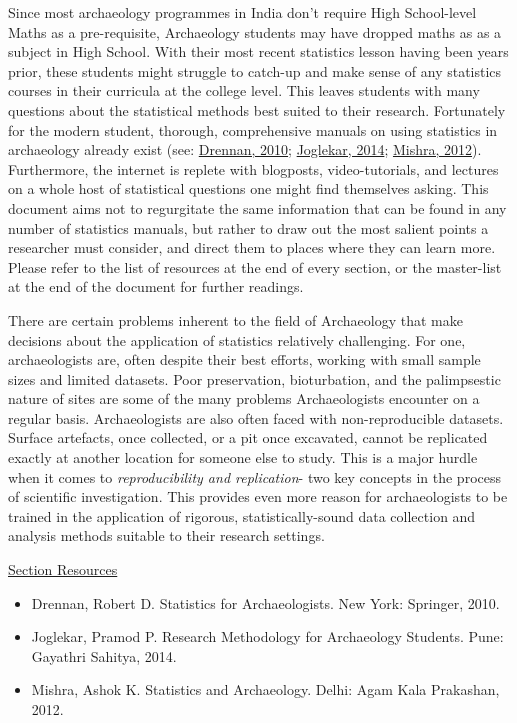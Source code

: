 \documentclass{article}
\begin{document}
Since most archaeology programmes in India don't require High School-level Maths as a pre-requisite, Archaeology students may have dropped maths as as a subject in High School. With their most recent statistics lesson having been years prior, these students might struggle to catch-up and make sense of any statistics courses in their curricula at the college level. This leaves students with many questions about the statistical methods best suited to their research. Fortunately for the modern student, thorough, comprehensive manuals on using statistics in archaeology already exist (see: \protect\hyperlink{drennan}{Drennan, 2010}; \protect\hyperlink{joglekar}{Joglekar, 2014}; \protect\hyperlink{mishra}{Mishra, 2012}). Furthermore, the internet is replete with blogposts, video-tutorials, and lectures on a whole host of statistical questions one might find themselves asking. This document aims not to regurgitate the same information that can be found in any number of statistics manuals, but rather to draw out the most salient points a researcher must consider, and direct them to places where they can learn more. Please refer to the list of resources at the end of every section, or the master-list at the end of the document for further readings.

There are certain problems inherent to the field of Archaeology that make decisions about the application of statistics relatively challenging. For one, archaeologists are, often despite their best efforts, working with small sample sizes and limited datasets. Poor preservation, bioturbation, and the palimpsestic nature of sites are some of the many problems Archaeologists encounter on a regular basis.
Archaeologists are also often faced with non-reproducible datasets. Surface artefacts, once collected, or a pit once excavated, cannot be replicated exactly at another location for someone else to study. This is a major hurdle when it comes to \textit{reproducibility and replication}- two key concepts in the process of scientific investigation. This provides even more reason for archaeologists to be trained in the application of rigorous, statistically-sound data collection and analysis methods suitable to their research settings.

\underline{Section Resources}
\begin{itemize}
    \item \hypertarget{drennan}{Drennan, Robert D. Statistics for Archaeologists. New York: Springer, 2010.}
    \item \hypertarget{joglekar}{Joglekar, Pramod P. Research Methodology for Archaeology Students. Pune: Gayathri Sahitya, 2014.}
    \item \hypertarget{mishra}{Mishra, Ashok K. Statistics and Archaeology. Delhi: Agam Kala Prakashan, 2012.}
\end{itemize}
\end{document}
